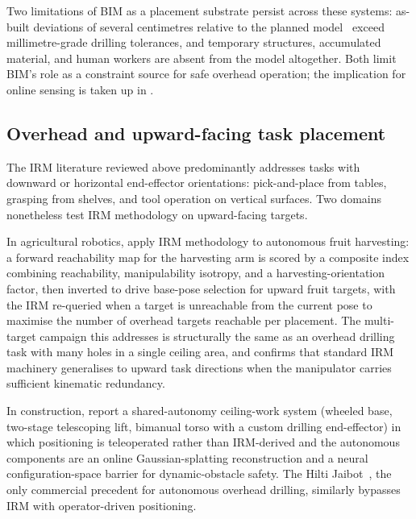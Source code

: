 \documentclass[11pt,a4paper]{article}
\begin{document}
Two limitations of BIM as a placement substrate persist across these systems: as-built deviations of several centimetres relative to the planned model~\citep{blum2020} exceed millimetre-grade drilling tolerances, and temporary structures, accumulated material, and human workers are absent from the model altogether. Both limit BIM's role as a constraint source for safe overhead operation; the implication for online sensing is taken up in .

\subsection{Overhead and upward-facing task placement}
\label{sec:sq5:overhead}

The IRM literature reviewed above predominantly addresses tasks with downward or horizontal end-effector orientations: pick-and-place from tables, grasping from shelves, and tool operation on vertical surfaces. Two domains nonetheless test IRM methodology on upward-facing targets.

In agricultural robotics, \citet{qiu2025fruitirm} apply IRM methodology to autonomous fruit harvesting: a forward reachability map for the harvesting arm is scored by a composite index combining reachability, manipulability isotropy, and a harvesting-orientation factor, then inverted to drive base-pose selection for upward fruit targets, with the IRM re-queried when a target is unreachable from the current pose to maximise the number of overhead targets reachable per placement. The multi-target campaign this addresses is structurally the same as an overhead drilling task with many holes in a single ceiling area, and confirms that standard IRM machinery generalises to upward task directions when the manipulator carries sufficient kinematic redundancy.

In construction, \citet{kimSharedAutonomyConstructionRobotic2025} report a shared-autonomy ceiling-work system (wheeled base, two-stage telescoping lift, bimanual torso with a custom drilling end-effector) in which positioning is teleoperated rather than IRM-derived and the autonomous components are an online Gaussian-splatting reconstruction and a neural configuration-space barrier for dynamic-obstacle safety. The Hilti Jaibot~\citep{hilti2020jaibot}, the only commercial precedent for autonomous overhead drilling, similarly bypasses IRM with operator-driven positioning.
\end{document}
